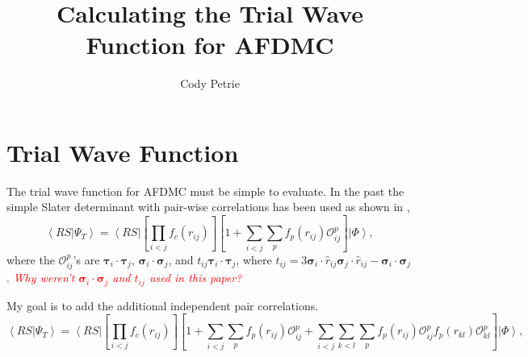 \documentclass[12pt]{extarticle}
\title{Calculating the Trial Wave Function for AFDMC}
\author{Cody Petrie}
\newcommand{\Oopij}{\mathcal{O}^p_{ij}}
\newcommand{\Oopkl}{\mathcal{O}^p_{kl}}
\newcommand{\ket}[1]{\left| #1 \right>}
\newcommand{\bra}[1]{\left< #1 \right|}
\newcommand{\braket}[2]{\left< #1 | #2 \right>}
\newcommand{\taui}{\bm{\tau}_i}
\newcommand{\tauj}{\bm{\tau}_j}
\newcommand{\sigmai}{\bm{\sigma}_i}
\newcommand{\sigmaj}{\bm{\sigma}_j}
\newcommand{\tauij}{\taui \cdot \tauj}
\newcommand{\sigmaij}{\sigmai \cdot \sigmaj}
\begin{document}
\maketitle

\section{Trial Wave Function}
The trial wave function for AFDMC must be simple to evaluate. In the past the simple Slater determinant with pair-wise correlations has been used as shown in \cite{gandolfi2014},
\begin{equation}
  \braket{RS}{\Psi_T} = \bra{RS} \left[ \prod_{i<j}f_c(r_{ij}) \right] \left[ 1+\sum_{i<j}\sum_p f_p(r_{ij})\Oopij \right] \ket{\Phi},
  \label{equ:simpletrial}
\end{equation}
where the $\Oopij$'s are $\tauij$, $\sigmaij$, and $t_{ij}\tauij$, where $t_{ij} = 3\sigmai \cdot \hat{r}_{ij} \sigmaj \cdot \hat{r}_{ij}-\sigmaij$. \textit{\textcolor{red}{Why weren't $\sigmaij$ and $t_{ij}$ used in this paper?}}

My goal is to add the additional independent pair correlations.
\begin{equation}
  \braket{RS}{\Psi_T} = \bra{RS} \left[ \prod_{i<j}f_c(r_{ij}) \right] \left[ 1+\sum_{i<j}\sum_p f_p(r_{ij})\Oopij + \sum_{i<j}\sum_{k<l}\sum_p f_p(r_{ij})\Oopij f_p(r_{kl})\Oopkl \right] \ket{\Phi},
\end{equation}
\end{document}
